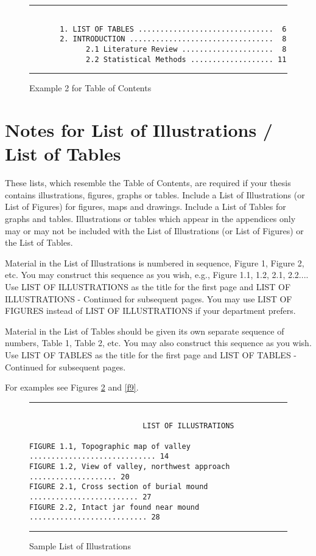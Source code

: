 \documentclass[draft]{ua-thesis}
\begin{document}
\begin{figure}
\hrule
\begin{verbatim}

       1. LIST OF TABLES ...............................  6
       2. INTRODUCTION .................................  8
             2.1 Literature Review .....................  8
             2.2 Statistical Methods ................... 11

\end{verbatim}
\hrule
\caption{Example 2 for Table of Contents} \label{f7}
\end{figure}

\section{Notes for List of Illustrations / List of Tables}

These lists, which resemble the Table of Contents, are required if your
thesis contains illustrations, figures, graphs or tables. Include a List of
Illustrations (or List of Figures) for figures, maps and drawings. Include a
List of Tables for graphs and tables. Illustrations or tables which appear
in the appendices only may or may not be included with the List of
Illustrations (or List of Figures) or the List of Tables.

Material in the List of Illustrations is numbered in sequence, Figure 1,
Figure 2, etc. You may construct this sequence as you wish, e.g., Figure
1.1, 1.2, 2.1, 2.2.... Use LIST OF ILLUSTRATIONS as the title for the first
page and LIST OF ILLUSTRATIONS - Continued for subsequent pages. You may use
LIST OF FIGURES instead of LIST OF ILLUSTRATIONS if your department prefers.

Material in the List of Tables should be given its own separate sequence of
numbers, Table 1, Table 2, etc. You may also construct this sequence as you
wish. Use LIST OF TABLES as the title for the first page and LIST OF TABLES
- Continued for subsequent pages.

For examples see Figures \ref{f8} and \ref{f9}.
\begin{figure}
\hrule
\begin{verbatim}

                          LIST OF ILLUSTRATIONS

FIGURE 1.1, Topographic map of valley ............................. 14
FIGURE 1.2, View of valley, northwest approach .................... 20
FIGURE 2.1, Cross section of burial mound ......................... 27
FIGURE 2.2, Intact jar found near mound ........................... 28

\end{verbatim}
\hrule
\caption{Sample List of Illustrations} \label{f8}
\end{figure}
\end{document}
